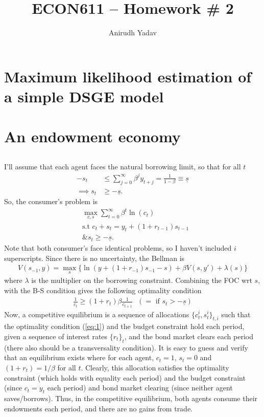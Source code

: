 \documentclass[12pt]{article}
\title{ECON611 -- Homework \# 2}
\author{Anirudh Yadav}
\begin{document}
\maketitle


\section{Maximum likelihood estimation of a simple DSGE model}

\newpage

\section{An endowment economy}

\subsection{}
I'll assume that each agent faces the natural borrowing limit, so that for all $t$
\begin{align*}
-s_t &\leq \sum_{j=0}^\infty\beta^jy_{t+j} = \frac{1}{1-\beta} \equiv \underline s\\
\implies s_t &\geq -\underline s.
\end{align*}
So, the consumer's problem is
\begin{align*}
&\max_{c, s} \sum_{t=0}^\infty \beta^t \ln(c_t)\\
&\text{s.t } c_t + s_t = y_t + (1+r_{t-1})s_{t-1}\\
&\text{\& } s_t \geq -\underline s.
\end{align*}
Note that both consumer's face identical problems, so I haven't included $i$ superscripts. Since there is no uncertainty, the Bellman is 
\begin{align*}
V(s_{-1} , y) = \max_s \{ \ln(y+(1+r_{-1})s_{-1} - s) + \beta V(s,y') + \lambda(s)\}
\end{align*}
where $\lambda$ is the multiplier on the borrowing constraint. Combining the FOC wrt $s$, with the B-S condition gives the following optimality condition
\begin{align}
\frac{1}{c_t} \geq (1+r_t)\beta \frac{1}{c_{t+1}} \text{ } (= \text{ if } s_t >- \underline s) \label{eq:1}
\end{align}
Now, a competitive equilibrium is a sequence of allocations $\{c^i_t, s^i_t\}_{t,i}$ such that the optimality condition (\ref{eq:1}) and the budget constraint hold each period, given a sequence of interest rates $\{r_t\}_t$, and the bond market clears each period (there also should be a transversality condition). It is easy to guess and verify that an equilibrium exists where for each agent, $c_t = 1$, $s_t = 0$ and $(1+r_t) = 1/\beta$ for all $t$. Clearly, this allocation satisfies the optimality constraint (which holds with equality each period) and the budget constraint (since $c_t = y_t$ each period) and bond market clearing (since neither agent saves/borrows). Thus, in the competitive equilibrium, both agents consume their endowments each period, and there are no gains from trade.
\end{document}
